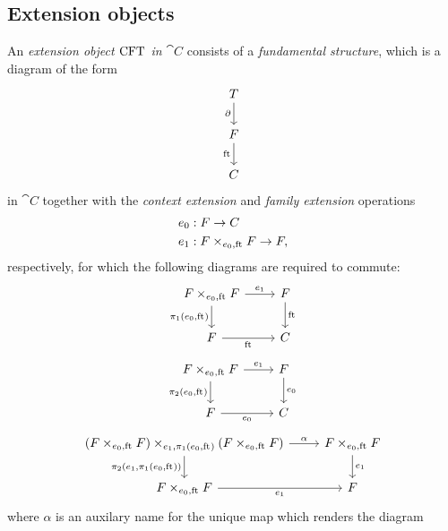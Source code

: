 \subsection{Extension objects}
\begin{defn}
An \emph{extension object $\mathrm{CFT}$ in $\cat{C}$} consists of a \emph{fundamental structure}, which is a diagram of the form
\begin{equation*}
\begin{tikzcd}
\stesyst
  \ar{d}[swap]{\ebd}
  \\
\stesysf
  \ar{d}[swap]{\eft}
  \\
\stesysc
\end{tikzcd}
\end{equation*}
in $\cat{C}$ together with the \emph{context extension} and \emph{family extension} operations
\begin{align*}
\ectxext &:\stesysf\to \stesysc\\
\efamext & :\stesysff\to \stesysf,
\end{align*}
respectively, for which the following diagrams are required to commute:
\begin{equation*}
\begin{tikzcd}
\stesysff 
  \ar{r}{\efamext} 
  \ar{d}[swap]{\pullbackpr{1}{\ectxext}{\eft}} 
  & 
\stesysf 
  \ar{d}{\eft}
  \\
\stesysf
  \ar{r}[swap]{\eft} 
  & 
\stesysc
\end{tikzcd}
\end{equation*}
\begin{equation*}
\begin{tikzcd}
\stesysff 
  \ar{d}[swap]{\pullbackpr{2}{\ectxext}{\eft}} 
  \ar{r}{\efamext} 
  & 
\stesysf 
  \ar{d}{\ectxext}
  \\
\stesysf 
  \ar{r}[swap]{\ectxext} 
  & 
\stesysc
\end{tikzcd}
\end{equation*}
\begin{equation*}
\begin{tikzcd}
\pullback{\stesysff}{\stesysff}{\efamext}{\pullbackpr{1}{\ectxext}{\eft}} 
  \ar{d}[swap]{\pullbackpr{2}{\efamext}{\pullbackpr{1}{\ectxext}{\eft}}}
  \ar{r}{\alpha}
  & 
\stesysff 
  \ar{d}{\efamext} 
  \\
\stesysff 
  \ar{r}[swap]{\efamext} 
  &
\stesysf
\end{tikzcd}
\end{equation*}
where $\alpha$ is an auxilary name for the unique map which renders the diagram
\begin{equation*}

\end{equation*}
\end{defn}
